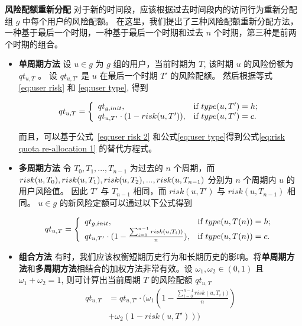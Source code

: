 \textbf{风险配额重新分配} 对于新的时间段，应该根据过去时间段内的访问行为重新分配组 $g$ 中每个用户的风险配额。 在这里，我们提出了三种风险配额重新分配方法，一种基于最后一个时期，一种基于最后一个时期和过去 $n$ 个时期，第三种是前两个时期的组合。

\begin{itemize}
	\item \textbf{单周期方法} 设 $u \in g$ 为 $g$ 组的用户，当前时期为 $T$, 该时期 $u$ 的风险份额为 $qt_{u,T}$ 。 设 $qt_{u,T'}$ 是 $u$ 在最后一个时期 $T'$ 的风险配额。
	然后根据等式 \ref{eq:user risk} 和 \ref{eq:user type}, 得到
	\begin{small}
		\begin{equation}\label{eq:risk quota re-allocation 1}
		qt_{u,T}=
		\left\{
		\begin{array}{ll}
		qt_{g,init}, & \hbox{if $type(u,T')=h$;} \\
		qt_{u,T'}\cdot (1-risk(u,T')), & \hbox{if $type(u,T')=c$.} \\
		\end{array}
		\right.
		\end{equation}
	\end{small}
	而且，可以基于公式~\ref{eq:user risk 2} 和公式\ref{eq:user type}得到公式\ref{eq:risk quota re-allocation 1} 的替代方程式。
	\item \textbf{多周期方法} 令 $T_0,T_1,...,T_{n-1}$ 为过去的 $n$ 个周期，而 $risk(u,T_0),risk(u,T_1),risk(u,T_2),..., \\risk(u,T_{n-1})$ 分别为 $n$ 个周期内 $u$ 的用户风险值。 因此 $T'$ 与 $T_{n-1}$ 相同，而 $risk(u,T')$ 与 $risk(u,T_{n-1})$ 相同。 $u \in g$ 的新风险定额可以通过以下公式得到
	
	\begin{equation}\label{eq:risk quota re-allocation 2}
		qt_{u,T}=
		\left\{
		\begin{array}{ll}
		qt_{g,init}, & \hbox{if $type(u,T(n))=h$;} \\
		qt_{u,T'}\cdot (1-\frac{ \sum _{i=0} ^ {n-1}risk(u,T_i))}{n}), & \hbox{if $type(u,T(n))=c$.} \\
		\end{array}
		\right.
		\end{equation}
	
	\item \textbf{组合方法} 有时，我们应该权衡短期历史行为和长期历史的影响。将\textbf{单周期方法}和\textbf{多周期方法}相结合的加权方法非常有效。设 $\omega_1, \omega_2 \in (0,1)$ 且 $\omega_1+ \omega_2 =1$, 则可计算出当前周期 $T$ 的风险配额 $qt_{u,T}$ 
	\begin{equation}\label{eq:risk quota re-allocation 3}
	\begin{aligned}
	qt_{u,T} &= qt_{u,T'}\cdot (\omega_1(1-\frac{ \sum _{i=0} ^ {n-1}risk(u,T_i))}{n}) \\
	&+ \omega_2(1-risk(u,T')))
	\end{aligned}
	\end{equation}
\end{itemize}

